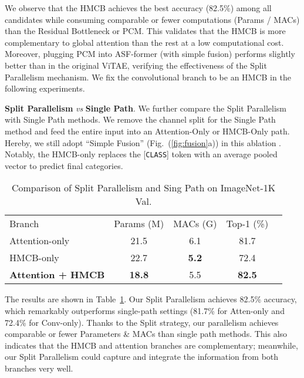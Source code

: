 \documentclass[lettersize,journal]{IEEEtran}
\begin{document}
We observe that the HMCB achieves the best accuracy (82.5\%) among all candidates while consuming comparable or fewer computations (Params / MACs) than the Residual Bottleneck or PCM. This validates that the HMCB is more complementary to global attention than the rest at a low computational cost. Moreover, plugging PCM into ASF-former (with simple fusion) performs slightly better than in the original ViTAE, verifying the effectiveness of the Split Parallelism mechanism. We fix the convolutional branch to be an HMCB in the following experiments.

\textbf{Split Parallelism} \textit{vs} \textbf{Single Path}. We further compare the Split Parallelism with Single Path methods. We remove the channel split for the Single Path method and feed the entire input into an Attention-Only or HMCB-Only path. Hereby,  we still adopt ``Simple Fusion'' (Fig.~(\ref{fig:fusion}a)) in this ablation . Notably, the HMCB-only replaces the [{\tt CLASS}] token with an average pooled vector to predict final categories.
\setlength{\tabcolsep}{4pt}
\begin{table}[th]
\begin{center}
\caption{Comparison of Split Parallelism and Sing Path on ImageNet-1K Val.}
\label{table:branch}
\begin{tabular}{lcccc}
\hline\noalign{\smallskip}
Branch &Params (M)&MACs (G)&Top-1 (\%)\\
\noalign{\smallskip}
\hline
\noalign{\smallskip}
Attention-only & 21.5 & 6.1 & 81.7\\
HMCB-only & 22.7 & \textbf{5.2} & 72.4\\
\textbf{Attention + HMCB}& \textbf{18.8} & 5.5 & \textbf{82.5} \\
\hline
\end{tabular}
\end{center}
\end{table}
\setlength{\tabcolsep}{1.4pt}

The results are shown in Table~\ref{table:branch}. Our Split Parallelism achieves 82.5\% accuracy, which remarkably outperforms single-path settings (81.7\% for Atten-only and 72.4\% for Conv-only). Thanks to the Split strategy, our parallelism achieves comparable or fewer Parameters \& MACs than single path methods. This also indicates that the HMCB and attention branches are complementary; meanwhile, our Split Parallelism could capture and integrate the information from both branches very well.
\end{document}
